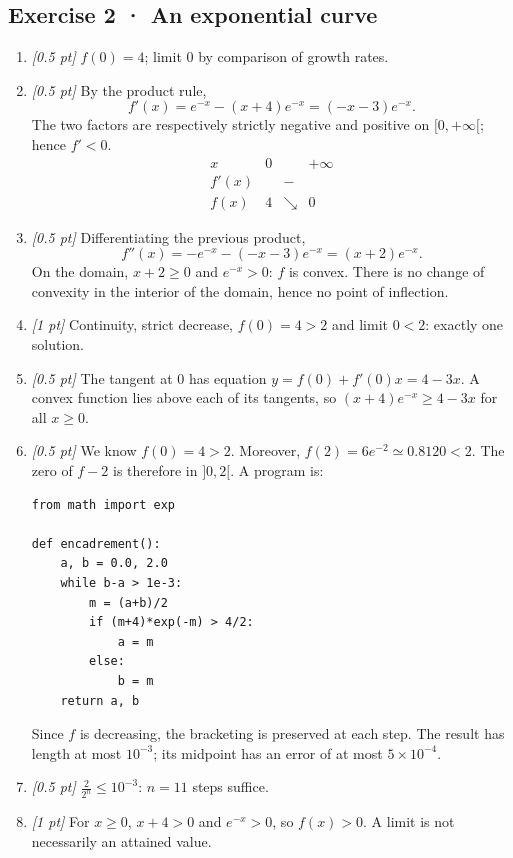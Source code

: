\subsection*{Exercise 2 · An exponential curve}\begin{enumerate}

\item \textit{[0.5 pt]} $f(0)=4$; limit $0$ by comparison of growth rates.

\item \textit{[0.5 pt]} By the product rule,
\[f'(x)=e^{-x}-(x+4)e^{-x}=(-x-3)e^{-x}.\]
The two factors are respectively strictly negative and positive on $[0,+\infty[$; hence $f'<0$.
\[\begin{array}{c|ccc}x&0&&+\infty\\\hline f'(x)&&-&\\\hline f(x)&4&\searrow&0\end{array}\]

\item \textit{[0.5 pt]} Differentiating the previous product,
\[f''(x)=-e^{-x}-(-x-3)e^{-x}=(x+2)e^{-x}.\]
On the domain, $x+2\ge0$ and $e^{-x}>0$: $f$ is convex. There is no change of convexity in the interior of the domain, hence no point of inflection.

\item \textit{[1 pt]} Continuity, strict decrease, $f(0)=4>2$ and limit $0<2$: exactly one solution.

\item \textit{[0.5 pt]} The tangent at $0$ has equation $y=f(0)+f'(0)x=4-3x$. A convex function lies above each of its tangents, so $(x+4)e^{-x}\ge 4-3x$ for all $x\ge0$.


\item \textit{[0.5 pt]} We know $f(0)=4>2$. Moreover, $f(2)=6e^{-2}\simeq\num{0,8120}<2$. The zero of $f-2$ is therefore in $]0,2[$. A program is:
\begin{lstlisting}
from math import exp

def encadrement():
    a, b = 0.0, 2.0
    while b-a > 1e-3:
        m = (a+b)/2
        if (m+4)*exp(-m) > 4/2:
            a = m
        else:
            b = m
    return a, b
\end{lstlisting}
Since $f$ is decreasing, the bracketing is preserved at each step. The result has length at most $10^{-3}$; its midpoint has an error of at most $5\times10^{-4}$.

\item \textit{[0.5 pt]} $\frac{2}{2^n}\le10^{-3}$: $n=11$ steps suffice.

\item \textit{[1 pt]} For $x\ge0$, $x+4>0$ and $e^{-x}>0$, so $f(x)>0$. A limit is not necessarily an attained value.

\end{enumerate}

